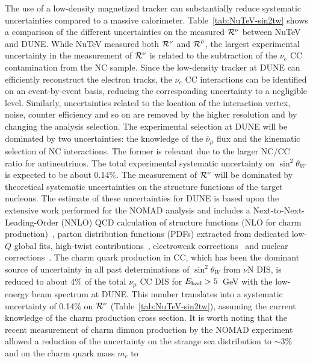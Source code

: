 The use of a low-density magnetized tracker can substantially reduce
systematic uncertainties compared to a massive
calorimeter. Table~\ref{tab:NuTeV-sin2tw} shows a comparison of the
different uncertainties on the measured ${\cal R}^\nu$ between NuTeV
and DUNE.  While NuTeV measured both ${\cal R}^\nu$ and ${\cal
  R}^{\overline{\nu}}$, the largest experimental uncertainty in the
measurement of ${\cal R}^\nu$ is related to the subtraction of the
$\nu_e$ CC contamination from the NC sample. Since the low-density
tracker at DUNE can efficiently reconstruct the electron tracks, the
$\nu_e$ CC interactions can be identified on an event-by-event basis,
reducing the corresponding uncertainty to a negligible
level. Similarly, uncertainties related to the location of the
interaction vertex, noise, counter efficiency and so on are removed by
the higher resolution and by changing the analysis selection. The
experimental selection at DUNE will be dominated by two uncertainties:
the knowledge of the $\overline{\nu}_\mu$ flux and the kinematic
selection of NC interactions. The former is relevant due to the larger
NC/CC ratio for antineutrinos. The total experimental systematic
uncertainty on $\sin^2 \theta_W$ is expected to be about 0.14\%.
The measurement of ${\cal R}^\nu$ will be dominated by theoretical
systematic uncertainties on the structure functions of the
target nucleons.  The estimate of these uncertainties for DUNE is
based upon the extensive work performed for the NOMAD analysis and
includes a Next-to-Next-Leading-Order (NNLO) QCD calculation of
structure functions (NLO for charm
production)~\cite{Alekhin:2007fh,Alekhin:2008ua,Alekhin:2008mb},
parton distribution functions (PDFs) extracted from dedicated low-$Q$
global fits, high-twist contributions~\cite{Alekhin:2007fh},
electroweak corrections~\cite{Arbuzov:2004zr} and nuclear
corrections~\cite{Kulagin:2004ie,Kulagin:2007ju,Kulagin:2010gd}. The
charm quark production in CC, which has been the dominant source of
uncertainty in all past determinations of $\sin^2 \theta_W$ from
$\nu$N DIS, is reduced to about 4\% of the total $\nu_\mu$ CC DIS for
$E_{\rm had}>5$~GeV with the low-energy beam spectrum at DUNE.  This
number translates into a systematic uncertainty of 0.14\% on ${\cal
  R}^\nu$ (Table~\ref{tab:NuTeV-sin2tw}), assuming the current
knowledge of the charm production cross section.  It is worth noting
that the recent measurement of charm dimuon production by the NOMAD
experiment allowed a reduction of the uncertainty on the strange sea
distribution to $\sim3\%$ and on the charm quark mass $m_c$ to
